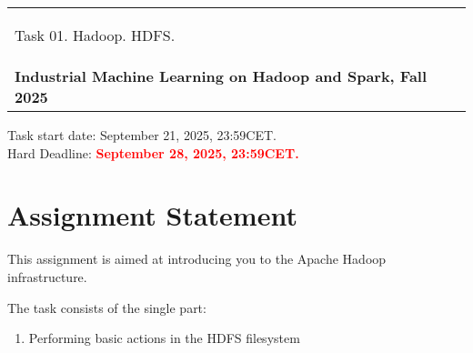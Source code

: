 \documentclass[10pt,fleqn]{article}
\begin{document}
\begin{center}
    \begin{tabular}{|p{17.5cm}|}
        \hline
        \begin{center} \Large Task 01. Hadoop. HDFS. \end{center}\\
        \textbf{Industrial Machine Learning on Hadoop and Spark, Fall 2025}\\
        \hline
    \end{tabular}
\end{center}

\begin{tabbing}
Task start date: September 21, 2025, 23:59CET.\\
Hard Deadline: \textcolor{red}{\bf September 28, 2025, 23:59CET.}
\end{tabbing}

\section*{Assignment Statement}
This assignment is aimed at introducing you to the Apache Hadoop infrastructure.

The task consists of the single part:
\begin{enumerate}
\item Performing basic actions in the HDFS filesystem
\end{enumerate}
\end{document}
